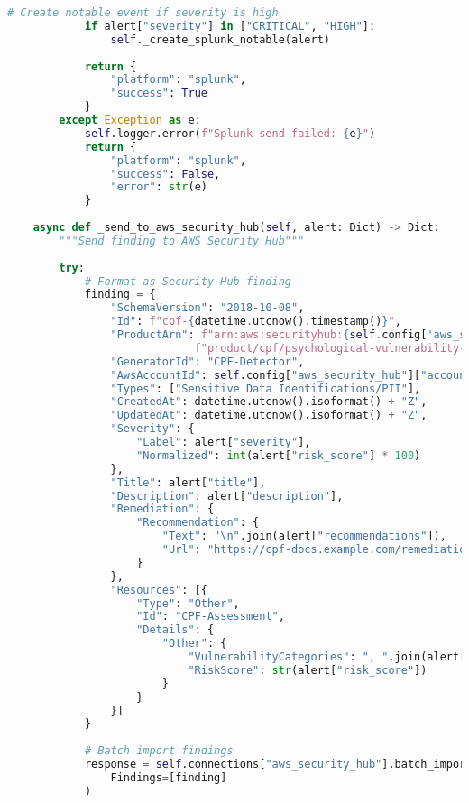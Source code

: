 \documentclass[11pt,a4paper]{article}
\begin{document}
\begin{lstlisting}[language=Python, caption=SIEM Integration Module]
            # Create notable event if severity is high
            if alert["severity"] in ["CRITICAL", "HIGH"]:
                self._create_splunk_notable(alert)
            
            return {
                "platform": "splunk",
                "success": True
            }
        except Exception as e:
            self.logger.error(f"Splunk send failed: {e}")
            return {
                "platform": "splunk",
                "success": False,
                "error": str(e)
            }
    
    async def _send_to_aws_security_hub(self, alert: Dict) -> Dict:
        """Send finding to AWS Security Hub"""
        
        try:
            # Format as Security Hub finding
            finding = {
                "SchemaVersion": "2018-10-08",
                "Id": f"cpf-{datetime.utcnow().timestamp()}",
                "ProductArn": f"arn:aws:securityhub:{self.config['aws_security_hub']['region']}::"
                             f"product/cpf/psychological-vulnerability-detector",
                "GeneratorId": "CPF-Detector",
                "AwsAccountId": self.config["aws_security_hub"]["account_id"],
                "Types": ["Sensitive Data Identifications/PII"],
                "CreatedAt": datetime.utcnow().isoformat() + "Z",
                "UpdatedAt": datetime.utcnow().isoformat() + "Z",
                "Severity": {
                    "Label": alert["severity"],
                    "Normalized": int(alert["risk_score"] * 100)
                },
                "Title": alert["title"],
                "Description": alert["description"],
                "Remediation": {
                    "Recommendation": {
                        "Text": "\n".join(alert["recommendations"]),
                        "Url": "https://cpf-docs.example.com/remediation"
                    }
                },
                "Resources": [{
                    "Type": "Other",
                    "Id": "CPF-Assessment",
                    "Details": {
                        "Other": {
                            "VulnerabilityCategories": ", ".join(alert["affected_categories"]),
                            "RiskScore": str(alert["risk_score"])
                        }
                    }
                }]
            }
            
            # Batch import findings
            response = self.connections["aws_security_hub"].batch_import_findings(
                Findings=[finding]
            )
            

\end{lstlisting}
\end{document}
